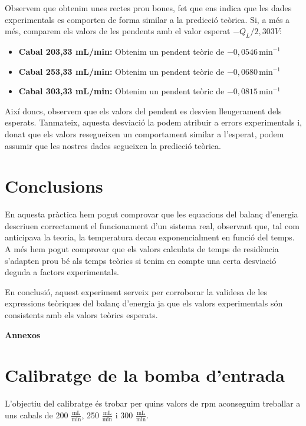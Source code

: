 \documentclass[10pt, twoside]{article}
\begin{document}
Observem que obtenim unes rectes prou bones, fet que ens indica que les dades experimentals es comporten de forma similar a la predicció teòrica. Si, a més a més, comparem els valors de les pendents amb el valor esperat ${-Q_L}/{2,303V}$:

\begin{itemize}
    \item \textbf{Cabal 203,33 mL/min:} Obtenim un pendent teòric de \( -0,0546 \, \text{min}^{-1} \)
    \item \textbf{Cabal 253,33 mL/min:} Obtenim un pendent teòric de \( -0,0680 \, \text{min}^{-1} \)
    \item \textbf{Cabal 303,33 mL/min:} Obtenim un pendent teòric de \( -0,0815 \, \text{min}^{-1} \)
\end{itemize}

Així doncs, observem que els valors del pendent es desvien lleugerament dels esperats. Tanmateix, aquesta desviació la podem atribuir a errors experimentals i, donat que els valors resegueixen un comportament similar a l'esperat, podem assumir que les nostres dades segueixen la predicció teòrica.


\section{Conclusions}
En aquesta pràctica hem pogut comprovar que les equacions del balanç d'energia descriuen correctament el funcionament d'un sistema real, observant que, tal com anticipava la teoria, la temperatura decau exponencialment en funció del temps. A més hem pogut comprovar que els valors calculats de temps de residència s'adapten prou bé als temps teòrics si tenim en compte una certa desviació deguda a factors experimentals.

En conclusió, aquest experiment serveix per corroborar la validesa de les expressions teòriques del balanç d'energia ja que els valors experimentals són consistents amb els valors teòrics esperats. 


\newpage
\appendix
{\Huge \textbf{Annexos}}

\section{Calibratge de la bomba d'entrada}
L'objectiu del calibratge és trobar per quins valors de rpm aconseguim treballar a uns cabals de 200 $\frac{\text{mL}}{\text{min}}$, 250 $\frac{\text{mL}}{\text{min}}$ i 300 $\frac{\text{mL}}{\text{min}}$. 
\end{document}
